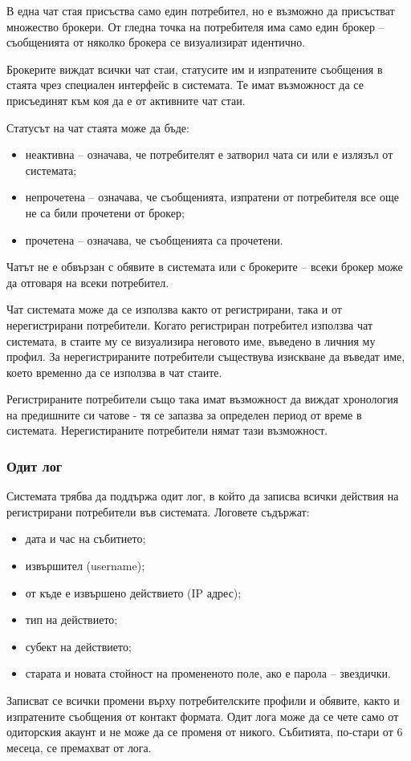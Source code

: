 \documentclass[a4paper]{article}
\begin{document}
В една чат стая присъства само един потребител, но е възможно да присъстват множество брокери. От гледна точка на потребителя има само един брокер -- съобщенията от няколко брокера се визуализират идентично.

Брокерите виждат всички чат стаи, статусите им и изпратените съобщения в стаята чрез специален интерфейс в системата. Те имат възможност да се присъединят към коя да е от активните чат стаи.


Статусът на чат стаята може да бъде:
\begin{itemize}
\item неактивна -- означава, че потребителят е затворил чата си или е излязъл от системата;
\item непрочетена -- означава, че съобщенията, изпратени от потребителя все още не са били прочетени от брокер;
\item прочетена -- означава, че съобщенията са прочетени.
\end{itemize}

Чатът не е обвързан с обявите в системата или с брокерите -- всеки брокер може да отговаря на всеки потребител.

Чат системата може да се използва както от регистрирани, така и от нерегистрирани потребители. Когато регистриран потребител използва чат системата, в стаите му се визуализира неговото име, въведено в личния му профил. За нерегистрираните потребители съществува изискване да въведат име, което временно да се използва в чат стаите.

Регистрираните потребители също така имат възможност да виждат хронология на предишните си чатове - тя се запазва за определен период от време в системата. Нерегистираните потребители нямат тази възможност.

\subsubsection{Одит лог}

Системата трябва да поддържа одит лог, в който да записва всички действия на регистрирани потребители във системата. Логовете съдържат:
	\begin{itemize}
	\item дата и час на събитието;
	\item извършител (username);
	\item от къде е извършено действието (IP адрес);
	\item тип на действието;
	\item субект на действието;
	\item старата и новата стойност на промененото поле, ако е парола -- звездички.
	\end{itemize}
Записват се всички промени върху потребителските профили и обявите, както и изпратените съобщения от контакт формата.
Одит лога може да се чете само от одиторския акаунт и не може да се променя от никого. Събитията, по-стари от 6 месеца, се премахват от лога.
\end{document}
